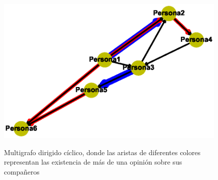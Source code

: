 \documentclass{article}
\begin{document}
\begin{center}

\end{center}
\begin{figure}[h]
\begin{center}
\includegraphics[scale=0.7]{Graf11.eps}\\
\caption{Multigrafo dirigido cíclico, donde las aristas de diferentes colores representan las existencia de más de una opinión sobre sus compañeros}
\end{center}
\end{figure}
\end{document}
